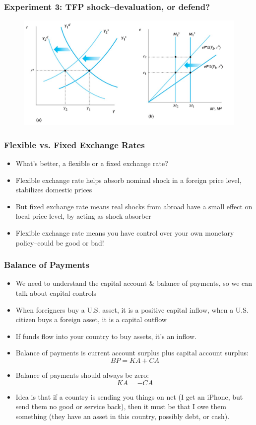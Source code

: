 \documentclass{beamer}
\begin{document}
\begin{frame}
\frametitle[alignment=center]{Experiment 3:  TFP shock--devaluation, or defend?}
\begin{figure}
\centering
\includegraphics[scale=0.7]{Figures/W_Fig_17pt10.png}
\end{figure}
\end{frame}


\begin{frame}
\frametitle[alignment=center]{ Flexible vs. Fixed Exchange Rates}
\begin{itemize}
\item What's better, a flexible or a fixed exchange rate?
\bigskip
\item Flexible exchange rate helps absorb nominal shock in a foreign price level, stabilizes domestic prices
\bigskip
\item But fixed exchange rate means real shocks from abroad have a small effect on local price level, by acting as shock absorber
\bigskip
\item Flexible exchange rate means you have control over your own monetary policy--could be good or bad!
\end{itemize}
\end{frame}

\begin{frame}
\frametitle[alignment=center]{ Balance of Payments}
\begin{itemize}
\item We need to understand the capital account \& balance of payments, so we can talk about capital controls
\bigskip
\item When foreigners buy a U.S. asset, it is a positive capital inflow, when a U.S. citizen buys a foreign asset, it is a capital outflow
\bigskip
\item If funds flow into your country to buy assets, it's an inflow.
\bigskip
\item Balance of payments is current account surplus plus capital account surplus:
$$BP=KA+CA$$
\item Balance of payments should always be zero:
$$KA=-CA$$
\item Idea is that if a country is sending you things on net (I get an iPhone, but send them no good or service back), then it must be that I owe them something (they have an asset in this country, possibly debt, or cash).  
\end{itemize}
\end{frame}
\end{document}
